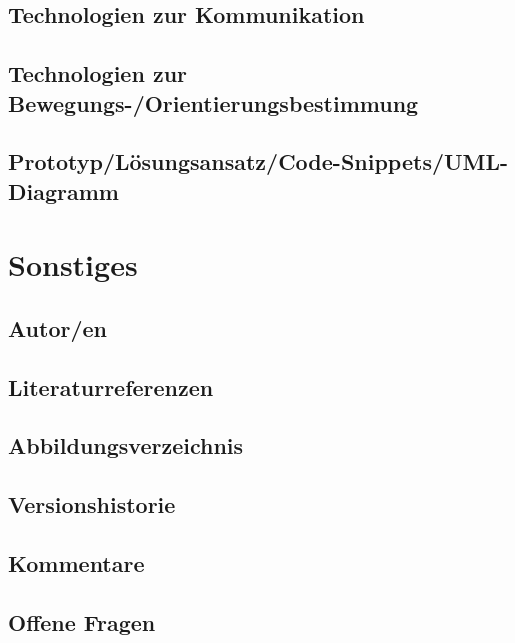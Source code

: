 \subsection*{Technologien zur Kommunikation}


\subsection*{Technologien zur Bewegungs-/Orientierungsbestimmung}


\subsection*{Prototyp/Lösungsansatz/Code-Snippets/UML-Diagramm}



\section*{Sonstiges}

\subsection*{Autor/en}

\subsection*{Literaturreferenzen}

\subsection*{Abbildungsverzeichnis}

\subsection*{Versionshistorie}

\subsection*{Kommentare}

\subsection*{Offene Fragen}